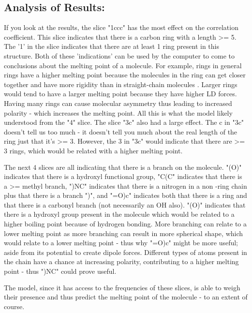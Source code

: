 \documentclass[11pt]{article}
\begin{document}
\subsection{Analysis of Results:}
\label{sec:org58eeeac}
If you look at the results, the slice "1ccc" has the most effect on the correlation coefficient. This slice indicates that there is
a carbon ring with a length >= 5. The '1' in the slice indicates that there are at least 1 ring present in this structure. Both of
these 'indications' can be used by the computer to come to conclusions about the melting point of a molecule. For example, rings in general rings have
a higher melting point because the molecules in the ring can get closer together and have more rigidity than in straight-chain molecules \cite{ring}. Larger rings
would tend to have a larger melting point because they have higher LD forces. Having many rings can cause molecular asymmetry \cite{martin2019polar} thus leading to increased polarity - which increases the melting point. All this is what the
model likely understood from the "4" slice. The slice "3c" also had a large effect. The c in "3c" doesn't tell us too much - it doesn't tell you much about the real length of the ring just that it's >= 3. However, the 3 in "3c" would indicate that there
are >= 3 rings, which would be related with a higher melting point.

The next 4 slices are all indicating that there is a branch on the molecule. "(O)" indicates that there is a hydroxyl functional group, "C(C" indicates that there is a >= methyl branch, ")NC" indicates
that there is a nitrogen in a non -ring chain plus that there is a branch ")", and "=O)c" indicates both that there is a ring and that there is a carbonyl branch (not necessarily an OH also). "(O)" indicates
that there is a hydroxyl group present in the molecule which would be related to a higher boiling point because of hydrogen bonding. More branching can relate to a lower melting point as more branching
can result in more spherical shape, which would relate to a lower melting point \cite{msu-edu} - thus why "=O)c" might be more useful; aside from its potential to create dipole forces. Different types of 
atoms present in the chain have a chance at increasing polarity, contributing to a higher melting point - thus ")NC" could prove useful.   

The model, since it has access to the frequencies of these slices, is able to weigh their presence and thus predict the melting point of the molecule - to an extent of course. 
\end{document}
